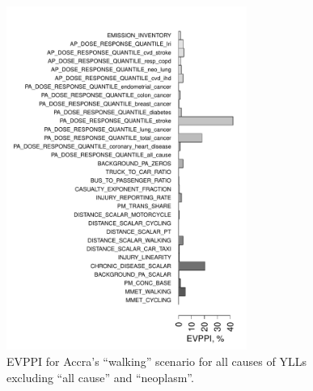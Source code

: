 \documentclass{article}
\begin{document}
\begin{figure}[h]
\includegraphics[width=0.7\textwidth]{accra_walk_evppi.pdf}
\caption{\small EVPPI for Accra's ``walking'' scenario for all causes of YLLs excluding ``all cause'' and ``neoplasm''.}
\label{evppi}
\end{figure}
\clearpage
\end{document}
